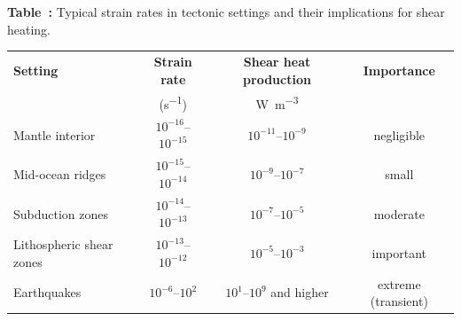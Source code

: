 \begin{center}
    \textbf{Table~\thetable:} Typical strain rates in tectonic settings and their implications for shear heating.
    \label{tab:strainrates}
    \begin{tabular}{lccc}
    \toprule
    \textbf{Setting} &
    \textbf{Strain rate}  &
    \textbf{Shear heat production} &
    \textbf{Importance} \\
    & (\si{s^{-1}}) & \si{W.m^{-3}} \\
    \midrule
    Mantle interior & $10^{-16}$--$10^{-15}$ & $10^{-11}$--$10^{-9}$ & negligible \\
    Mid-ocean ridges & $10^{-15}$--$10^{-14}$ & $10^{-9}$--$10^{-7}$ & small \\
    Subduction zones & $10^{-14}$--$10^{-13}$ & $10^{-7}$--$10^{-5}$ & moderate \\
    Lithospheric shear zones & $10^{-13}$--$10^{-12}$ & $10^{-5}$--$10^{-3}$ & important \\
    Earthquakes & $10^{-6}$--$10^{2}$ & $10^{1}$--$10^{9}$ and higher & extreme (transient) \\
    \bottomrule
    \end{tabular}
\end{center}